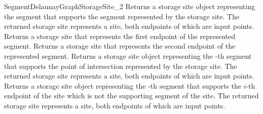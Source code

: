 \begin{ccRefConcept}{SegmentDelaunayGraphStorageSite_2}
\ccAccessFunctions
%
\ccGlue
{}
         {Returns a storage site object representing the segment
           that supports the segment represented by the storage site.
           The returned storage site represents a site, both endpoints
           of which are input points.
  }
%
\ccGlue
{}
{Returns a storage site that represents the first endpoint of the
  represented segment.
  }
%
\ccGlue
{}
{Returns a storage site that represents the second endpoint of the
  represented segment.
  }
%
\ccGlue
{}
         {Returns a storage site object representing the -th
           segment that supports the point of intersection represented
           by the storage site.
           The returned storage site represents a site, both endpoints
           of which are input points.
  }
%
\ccGlue
{}
         {Returns a storage site object representing the -th
           segment that supports the $i$-th endpoint of the site
           which is not the supporting segment of the site.
           The returned storage site represents a site, both endpoints
           of which are input points.
           }
%
\ccGlue
{}
%
\ccGlue
{}
\end{ccRefConcept}
